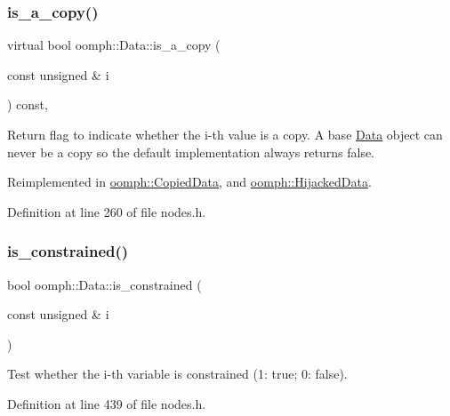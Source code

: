 \subsubsection{\texorpdfstring{is\+\_\+a\+\_\+copy()}{is\_a\_copy()}\hspace{0.1cm}{\footnotesize\ttfamily [2/2]}}
{\footnotesize\ttfamily virtual bool oomph\+::\+Data\+::is\+\_\+a\+\_\+copy (\begin{DoxyParamCaption}\item[{const unsigned \&}]{i }\end{DoxyParamCaption}) const\hspace{0.3cm}{\ttfamily [inline]}, {\ttfamily [virtual]}}



Return flag to indicate whether the i-\/th value is a copy. A base \hyperlink{classoomph_1_1Data}{Data} object can never be a copy so the default implementation always returns false. 



Reimplemented in \hyperlink{classoomph_1_1CopiedData_a80b677702e0cb94c5356214f5cf9f9fb}{oomph\+::\+Copied\+Data}, and \hyperlink{classoomph_1_1HijackedData_acfd12ec29b7787c8796effbb8284892d}{oomph\+::\+Hijacked\+Data}.



Definition at line 260 of file nodes.\+h.

\mbox{\label{classoomph_1_1Data_ac3169455e25c1dc8fd2d3de458c5e101}} 
\subsubsection{\texorpdfstring{is\+\_\+constrained()}{is\_constrained()}}
{\footnotesize\ttfamily bool oomph\+::\+Data\+::is\+\_\+constrained (\begin{DoxyParamCaption}\item[{const unsigned \&}]{i }\end{DoxyParamCaption})\hspace{0.3cm}{\ttfamily [inline]}}



Test whether the i-\/th variable is constrained (1\+: true; 0\+: false). 



Definition at line 439 of file nodes.\+h.



